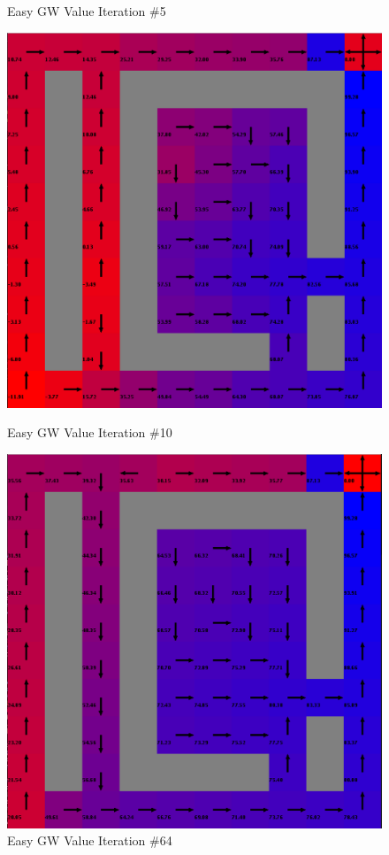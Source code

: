 \documentclass[h]{article}
\begin{document}
\begin{figure}[H]
      \caption*{Easy GW Value Iteration \#5} 
   \endminipage\hfill
      \includegraphics[width=1\textwidth,keepaspectratio]{easy-value-10.png} 
      \caption*{Easy GW Value Iteration \#10} 
   \endminipage\hfill
      \includegraphics[width=1\textwidth,keepaspectratio]{easy-value-64.png} 
      \caption*{Easy GW Value Iteration \#64} 
   \endminipage\hfill
\end{figure}
\end{document}
